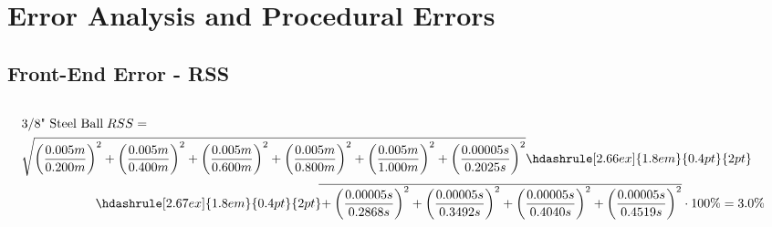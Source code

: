 \chapter{Error Analysis and Procedural Errors}

\section{Front-End Error - RSS}



\begin{fleqn}
\begin{equation*}
  \begin{split}
  \\[-1ex]
      & \text{3/8" Steel Ball} \; RSS = \\
      &\begin{multlined}[0.9\linewidth]
      \sqrt{\left( \frac{0.005m}{0.200m} \right)^2 + \left( \frac{0.005m}{0.400m} \right)^2 + \left( \frac{0.005m}{0.600m} \right)^2 + \left( \frac{0.005m}{0.800m} \right)^2 + \left( \frac{0.005m}{1.000m} \right)^2 + \left( \frac{0.00005s}{0.2025s} \right)^2 }\hdashrule[2.66ex]{1.8em}{0.4pt}{2pt} \\[0.5ex]
      {\hdashrule[2.67ex]{1.8em}{0.4pt}{2pt}}\mkern -4mu\overline{\rule{0pt}{2.4ex} + \left( \frac{0.00005s}{0.2868s} \right)^2 + \left( \frac{0.00005s}{0.3492s} \right)^2 + \left( \frac{0.00005s}{0.4040s} \right)^2 + \left( \frac{0.00005s}{0.4519s} \right)^2} \cdot 100\% = 3.0\%
      \end{multlined}
  \end{split}
\end{equation*}
\end{fleqn}

